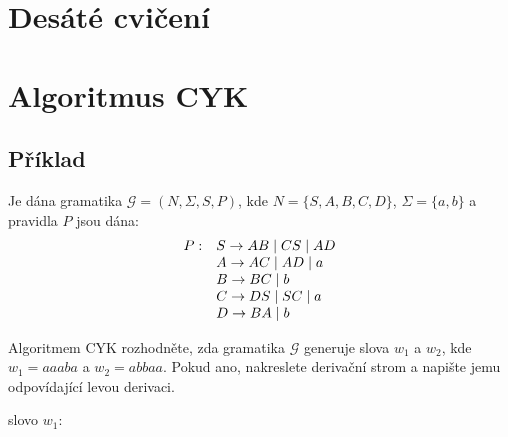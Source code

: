 \section{Desáté cvičení}
 
\section*{Algoritmus CYK}

\subsection{Příklad} %

Je dána gramatika $\mathcal{G} = (N, \Sigma, S, P)$, kde 
$N = \{S, A, B, C, D\}$, $\Sigma = \{a, b\}$ a pravidla $P$ jsou dána:
\vspace*{-4mm}
\[
    \begin{array}{l l}
        P: & S \rightarrow AB \mid CS \mid AD \\
           & A \rightarrow AC \mid AD \mid a \\
           & B \rightarrow BC \mid b \\
           & C \rightarrow DS \mid SC \mid a \\
           & D \rightarrow BA \mid b \\
    \end{array}
\]

Algoritmem CYK rozhodněte, zda gramatika $\mathcal{G}$ generuje slova $w_1$ a $w_2$, kde $w_1 = aaaba$ a $w_2 = abbaa$.  
Pokud ano, nakreslete derivační strom a napište jemu odpovídající levou derivaci.
\vspace*{3mm}

slovo $w_1$:

